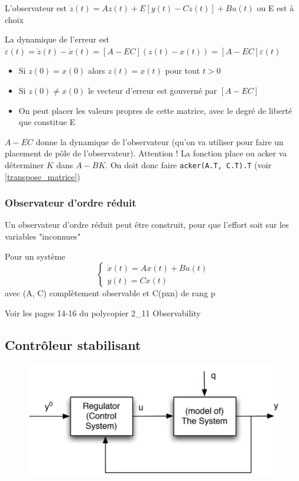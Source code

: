 \documentclass[resume]{subfiles}
\begin{document}
L'observateur est $\dot{z}(t)= Az(t)+E[y(t)-Cz(t)]+Bu(t)$ ou E est à choix

La dynamique de l'erreur est $\dot{\varepsilon}(t) = \dot{z}(t) - \dot{x}(t) = [A - EC] (z(t) - x(t)) = [A - EC] \varepsilon(t)$ 
\begin{itemize}
\item Si $z(0)=x(0)$ alors $z(t)=x(t)$ pour tout $t>0$ 
\item Si $z(0)\neq x(0)$ le vecteur d'erreur est gouverné par $[A-EC]$ 
\item On peut placer les valeurs propres de cette matrice, avec le degré de liberté que constitue E  
\end{itemize}
$A-EC$ donne la dynamique de l'observateur (qu'on va utiliser pour faire un placement de pôle de l'observateur). Attention ! La fonction place ou acker va déterminer $K$ dans $A-BK$. On doit donc faire
\verb!acker(A.T, C.T).T! (voir \ref{transpose_matrice})
\subsubsection{Observateur d'ordre réduit}

Un observateur d’ordre réduit peut être construit, pour que l'effort soit sur les variables "inconnues"

  Pour un système \begin{equation}\begin{cases}\dot{x}(t)=Ax(t)+Bu(t)\\y(t)=Cx(t)\end{cases}\end{equation} avec (A, C) complètement observable et C(pxn) de rang p

Voir les pages 14-16 du polycopier 2\_11 Observability 

\subsection{Contrôleur stabilisant}

\begin{figure}[H]
    \centering
    \includegraphics[width=1\columnwidth]{Figures/CtrlStab_1.png}
\end{figure}
\end{document}
